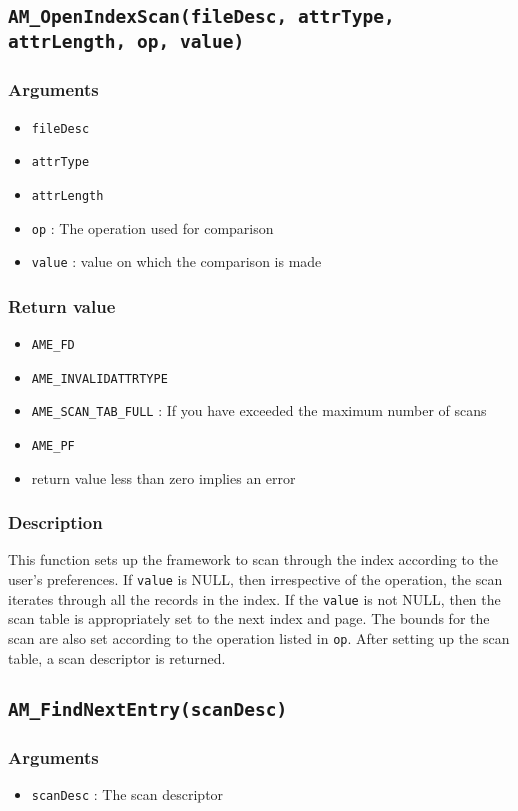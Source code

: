\documentclass[a4paper, 12pt]{article}
\begin{document}
\subsection{\texttt{AM\_OpenIndexScan(fileDesc, attrType, attrLength, op, value)}}
\subsubsection{Arguments}
\begin{itemize}
	\item{\texttt{fileDesc}}
	\item{\texttt{attrType}}
	\item{\texttt{attrLength}}
	\item{\texttt{op} : The operation used for comparison}
	\item{\texttt{value} : value on which the comparison is made}
\end{itemize}
\subsubsection{Return value}
\begin{itemize}
	\item{\texttt{AME\_FD}}
	\item{\texttt{AME\_INVALIDATTRTYPE}}
	\item{\texttt{AME\_SCAN\_TAB\_FULL} : If you have exceeded the maximum number of scans}
	\item{\texttt{AME\_PF}}
	\item{return value less than zero implies an error}
\end{itemize}
\subsubsection{Description}
This function sets up the framework to scan through the index according to the user's preferences. If \texttt{value} is NULL, then irrespective of the operation, the scan iterates through all the records in the index. If the \texttt{value} is not NULL, then the scan table is appropriately set to the next index and page. The bounds for the scan are also set according to the operation listed in \texttt{op}. After setting up the scan table, a scan descriptor is returned.

\subsection{\texttt{AM\_FindNextEntry(scanDesc)}}
\subsubsection{Arguments}
\begin{itemize}
	\item{\texttt{scanDesc} : The scan descriptor}
\end{itemize}
\end{document}
